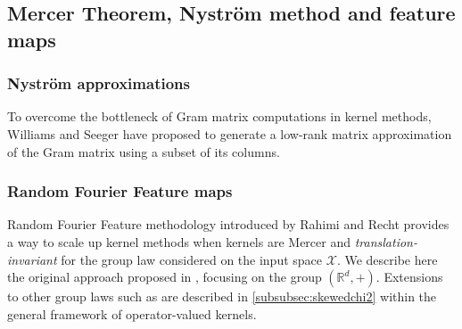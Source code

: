 \subsection{Mercer Theorem, Nystr\"om method and feature maps}
\subsubsection{Nystr\"om approximations}
To overcome the bottleneck of Gram matrix computations in kernel methods,
Williams and Seeger \cite{Williams2000-nystrom} have proposed to generate a
low-rank matrix approximation of the Gram matrix using a subset of its columns.
\subsubsection{Random Fourier Feature maps}
Random Fourier Feature methodology introduced  by Rahimi and Recht
\cite{Rahimi2007} provides a way to scale up kernel methods when kernels are
Mercer and \emph{translation-invariant}  for the group law considered on the
input space $\mathcal{X}$. We describe here the original approach proposed in
\cite{Rahimi2007}, focusing on the group $(\mathbb{R}^d, +)$. Extensions to
other group laws such as \cite{li2010random} are described in
\cref{subsubsec:skewedchi2} within the general framework of operator-valued
kernels.
